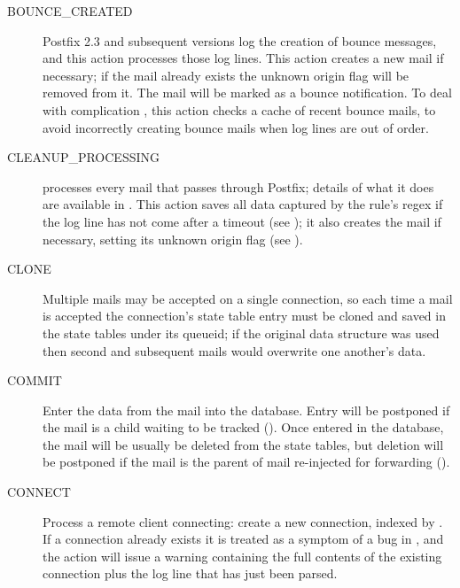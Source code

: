 \begin{description}

    \item [BOUNCE\_CREATED] Postfix 2.3 and subsequent versions log the
        creation of bounce messages, and this action processes those log
        lines.  This action creates a new mail if necessary; if the mail
        already exists the unknown origin flag will be removed from it.
        The mail will be marked as a bounce notification.  To deal with
        complication , this action checks a cache of recent
        bounce mails, to avoid incorrectly creating bounce mails when log
        lines are out of order.

    \item [CLEANUP\_PROCESSING]  processes every mail that
        passes through Postfix; details of what it does are available in
        .  This action saves all data captured
        by the rule's regex if the log line has not come after a timeout
        (see ); it also creates
        the mail if necessary, setting its unknown origin flag (see
        ).

    \item [CLONE] Multiple mails may be accepted on a single connection, so
        each time a mail is accepted the connection's state table entry
        must be cloned and saved in the state tables under its queueid; if
        the original data structure was used then second and subsequent
        mails would overwrite one another's data.

    \item [COMMIT] Enter the data from the mail into the database.  Entry
        will be postponed if the mail is a child waiting to be tracked
        ().  Once entered in the database,
        the mail will be usually be deleted from the state tables, but
        deletion will be postponed if the mail is the parent of mail
        re-injected for forwarding ().

    \item [CONNECT] Process a remote client connecting: create a new
        connection, indexed by  .  If a
        connection already exists it is treated as a symptom of a bug in
        \parsername{}, and the action will issue a warning containing the
        full contents of the existing connection plus the log line that has
        just been parsed.


\end{description}
